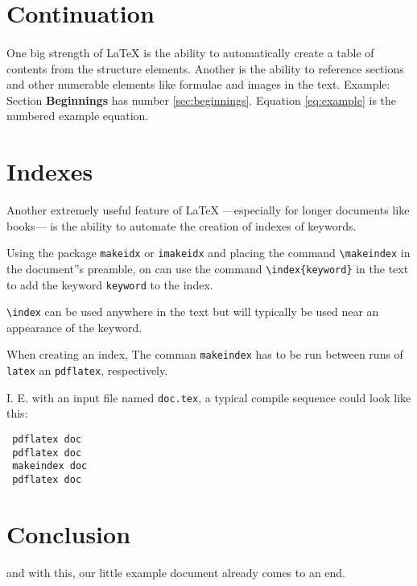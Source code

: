 \documentclass{article}
\begin{document}
\section{Continuation}

\paragraph{}One big strength of {\LaTeX} is the ability to automatically create a table of contents from the
structure elements. Another is the ability to reference  sections and other numerable elements like formulae
and images in the text. Example: Section \textbf{Beginnings} has number \ref{sec:beginnings}.
Equation \ref{eq:example} is the numbered example equation.


\section{Indexes}

Another extremely useful feature of  {\LaTeX} ---especially for longer documents like books--- is the ability to automate the creation of indexes of keywords.

Using the package \verb+makeidx+ or \verb+imakeidx+ and placing the  command  \verb+\makeindex+ in the document''s preamble, on can use the command \verb+\index{keyword}+ in the text to add the keyword  \texttt{keyword} to the index.

\verb+\index+ can be used anywhere in the text but will typically be used near an  appearance of the keyword.

When creating an index,  The comman \verb+makeindex+ has to be run between runs of \verb+latex+ an \verb+pdflatex+, respectively.

I. E. with an input file named \verb+doc.tex+, a typical compile sequence could look like this:



\begin{lstlisting}
 pdflatex doc
 pdflatex doc
 makeindex doc
 pdflatex doc
\end{lstlisting}








\section{Conclusion}

and with this, our little example document already comes to an end.



\printindex
{}
\end{document}

